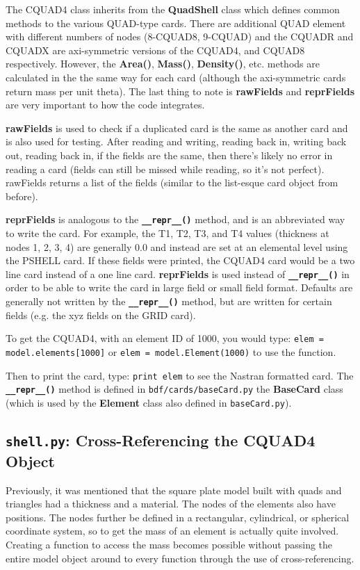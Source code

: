      The CQUAD4 class inherits from the {\bf QuadShell} class which defines common methods to the various QUAD-type cards.  There are additional QUAD element with different numbers of nodes (8-CQUAD8, 9-CQUAD) and the CQUADR and CQUADX are axi-symmetric versions of the CQUAD4, and CQUAD8 respectively.  However, the {\bf Area()}, {\bf Mass()}, {\bf Density()}, etc. methods are calculated in the the same way for each card (although the axi-symmetric cards return mass per unit theta).  The last thing to note is {\bf rawFields} and {\bf reprFields} are very important to how the code integrates.
     
     {\bf rawFields} is used to check if a duplicated card is the same as another card and is also used for testing.  After reading and writing, reading back in, writing back out, reading back in, if the fields are the 
     same, then there's likely no error in reading a card (fields can still be missed while reading, so it's not perfect).  rawFields returns a list of the fields (similar to the list-esque card object from before).
     
     {\bf reprFields} is analogous to the {\bf \tt \_\_repr\_\_()} method, and is an abbreviated way to write the card.  For example, the T1, T2, T3, and T4 values (thickness at nodes 1, 2, 3, 4) are generally 0.0 and instead are set at an elemental level using the PSHELL card.  If these fields were printed, the CQUAD4 card would be a two line card instead of a one line card.  {\bf reprFields} is used instead of {\bf \tt \_\_repr\_\_()} in order to be able to write the card in large field or small field format.  Defaults are generally not written by the {\bf \tt \_\_repr\_\_()} method, but are written for certain fields (e.g. the xyz fields on the GRID card).
    
     To get the CQUAD4, with an element ID of 1000, you would type:
       {\tt elem = model.elements[1000]} or
       {\tt elem = model.Element(1000)} to use the function.
     
     Then to print the card, type:
       {\tt print elem}
     to see the Nastran formatted card.  The {\bf \tt \_\_repr\_\_()} method is defined in {\tt bdf/cards/baseCard.py} the {\bf BaseCard} class (which is used by the {\bf Element} class also defined in {\tt baseCard.py}).

 \subsection{{\tt shell.py}: Cross-Referencing the CQUAD4 Object}
     Previously, it was mentioned that the square plate model built with quads and triangles had a thickness and a material.  The nodes of the elements also have positions.  The nodes further be defined in a rectangular, cylindrical, or spherical coordinate system, so to get the mass of an element is actually quite involved.  Creating a function to access the mass becomes possible without passing the entire model object around to every function through the use of cross-referencing.
     
